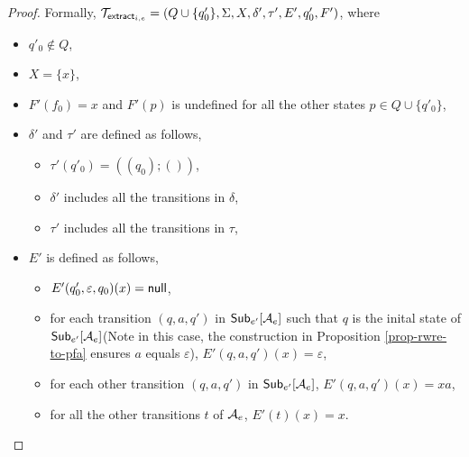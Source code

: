 \begin{proof}
        Formally, $\mathcal{T}_{\mathsf{extract}_{i,e}} = (Q \cup \{q'_0\}, \Sigma, X, \delta', \tau', E', q'_0, F')$, where 
        \begin{itemize}
            \item $q'_0 \not \in Q$,
            \item $X = \{x\}$,
            \item $F'(f_0)= x$ and $F'(p)$ is undefined for all the other states $p \in Q  \cup \{q'_0\}$,
            \item $\delta'$ and $\tau'$ are defined as follows,
                \begin{itemize}
                    \item $\tau'(q'_0) = ((q_0); ())$,
                    \item $\delta'$ includes all the transitions in $\delta$,
                    \item $\tau'$ includes all the transitions in $\tau$,
                \end{itemize}
            \item $E'$ is defined as follows,
                \begin{itemize}
                    \item $E'(q'_0, \varepsilon, q_0)(x) = \mathsf{null}$,
                    \item for each transition $(q, a, q')$ in ${\sf Sub}_{e'}[\mathcal{A}_e]$ such that $q$ is the inital state of ${\sf Sub}_{e'}[\mathcal{A}_e]$(Note in this case, the construction in Proposition \ref{prop-rwre-to-pfa} ensures $a$ equals $\varepsilon$), $E'(q, a, q')(x) = \varepsilon$,
                    \item for each other transition $(q, a, q')$ in ${\sf Sub}_{e'}[\mathcal{A}_e]$, $E'(q, a, q')(x) = x a$,

                    \item for all the other transitions $t$ of $\mathcal{A}_e$, $E'(t)(x) = x$.
                \end{itemize}
        \end{itemize}


\end{proof}
